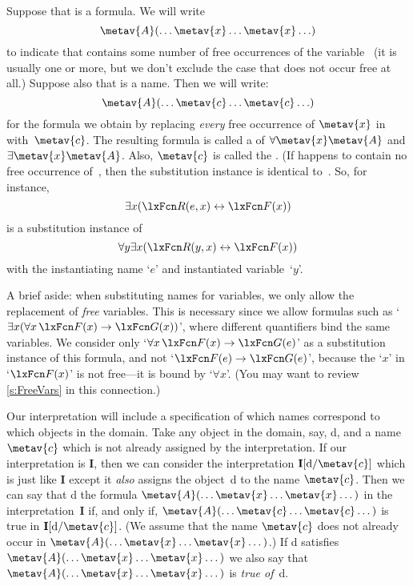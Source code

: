 Suppose that  is a formula. We will write
$$\metav{A}(\ldots \metav{x} \ldots \metav{x} \ldots)$$ to indicate
that  contains some number of free occurrences of the
variable~ (it is usually one or more, but we don't exclude
the case that  does not occur free at all.) Suppose also that
 is a name. Then we will write:
$$\metav{A}(\ldots \metav{c} \ldots \metav{c} \ldots)$$
for the formula we obtain by replacing \emph{every} free occurrence of
$\metav{x}$ in  with~$\metav{c}$. The resulting formula is
called a  of $\forall
\metav{x}\metav{A}$ and $\exists\metav{x}\metav{A}$. Also, $\metav{c}$
is called the . (If  happens to
contain no free occurrence of~, then the substitution
instance is identical to~. So, for instance,
	$$\exists x (\atom{R}{e,x} \eiff \atom{F}{x})$$
is a substitution instance of 
	$$\forall y \exists x (\atom{R}{y,x} \eiff \atom{F}{x})$$
with the instantiating name `$e$' and instantiated variable~`$y$'.


A brief aside: when substituting names for variables, we only allow
the replacement of \emph{free} variables. This is necessary since we
allow formulas such as `$\exists x(\forall x\,\atom{F}{x} \eif
\atom{G}{x})$', where different quantifiers bind the same variables.
We consider only `$\forall x\,\atom{F}{x} \eif \atom{G}{e}$' as a
substitution instance of this formula, and not `$\atom{F}{e} \eif
\atom{G}{e}$', because the `$x$' in `$\atom{F}{x}$' is not free---it
is bound by `$\forall x$'. (You may want to review \cref{s:FreeVars}
in this connection.)

Our interpretation will include a specification of which names
correspond to which objects in the domain. Take any object in the
domain, say, d, and a name $\metav{c}$ which is not already assigned
by the interpretation. If our interpretation is $\mathbf{I}$, then we
can consider the interpretation $\mathbf{I}[\text{d}/\metav{c}]$
which is just like $\mathbf{I}$ except it \emph{also} assigns the
object~d to the name $\metav{c}$. Then we can say that d
 the formula
$\metav{A}(\dots\metav{x}\dots\metav{x}\dots)$ in the
interpretation~$\mathbf{I}$ if, and only if,
$\metav{A}(\dots\metav{c}\dots\metav{c}\dots)$ is true in
$\mathbf{I}[\text{d}/\metav{c}]$. (We assume that the name
$\metav{c}$ does not already occur in
$\metav{A}(\dots\metav{x}\dots\metav{x}\dots)$.) If d satisfies
$\metav{A}(\dots\metav{x}\dots\metav{x}\dots)$ we also say that
$\metav{A}(\dots\metav{x}\dots\metav{x}\dots)$ is \emph{true of}~d.

